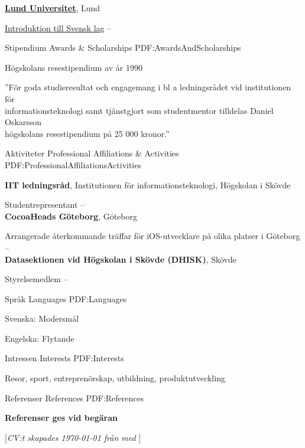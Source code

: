 \documentclass[letterpaper,MMMyyyy,nonstopmode]{resume}
\newcommand{\gitrevision}{%
  \StrLeft{\HEAD}{7}%
}
\newcommand{\CVNote}{CV:t skapades {\today} från {\gitrevision} med {\XeLaTeX}}
\begin{document}
\begin{Body}
\BigGap
\Entry
\href{https://www.law.lu.se/}
{\textbf{Lund Universitet}},
Lund

\Gap
\BulletItem
\href{https://www.lu.se/lubas/i-uoh-lu-JURF11}
{Introduktion till Svensk lag}
\hfill
{} --


\Section
{Stipendium}
{Awards \& Scholarships}
{PDF:AwardsAndScholarships}

\BulletItem
Högskolans resestipendium av år 1990
\hfill
{}
\begin{Detail}
\Item
''För goda studieresultat och engagemang i bl a ledningsrådet vid institutionen för\\
informationsteknologi samt tjänstgjort som studentmentor tilldelas Daniel Oskarsson\\
högskolans resestipendium på 25 000 kronor.''
\end{Detail}


\Section
{Aktiviteter}
{Professional Affiliations \& Activities}
{PDF:ProfessionalAffiliationsActivities}

\Entry
\textbf{IIT ledningsråd}, Institutionen för informationsteknologi, Högskolan i Skövde

\Gap
\BulletItem
Studentrepresentant
\hfill
{} -- 
\\
\Entry
\textbf{CocoaHeads Göteborg}, Göteborg

\Gap
\BulletItem
Arrangerade återkommande träffar för iOS-utvecklare på olika platser i Göteborg
\hfill
{} -- 
\\
\Entry
\textbf{Datasektionen vid Högskolan i Skövde (DHISK)}, Skövde

\Gap
\BulletItem
Styrelsemedlem
\hfill
{} -- 


\Section
{Språk}
{Languages}
{PDF:Languages}

\BulletItem
Svenska: Modersmål

\Gap
\BulletItem
Engelska: Flytande


\Section
{Intressen}
{Interests}
{PDF:Interests}

\Entry
Resor, sport, entreprenörskap, utbildning, produktutveckling


\Section
{Referenser}
{References}
{PDF:References}

\textbf{Referenser ges vid begäran}

\end{Body}


\BigGap
\UseNoteFont%
\null\hfill%
[\textit{\CVNote}]
\end{document}
